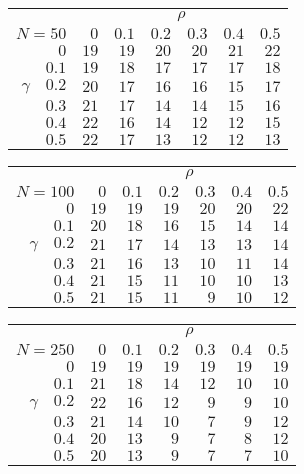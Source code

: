 \begin{tabular}{r|rrrrrr}
\hline\hline
 &\multicolumn{6}{c}{$\rho$} \\ 
 $N = 50$ & $0$ & $0.1$ & $0.2$ & $0.3$ & $0.4$ & $0.5$ \\ 
 \hline$0$ & $19$ & $19$ & $20$ & $20$ & $21$ & $22$\\ 
$0.1$ & $19$ & $18$ & $17$ & $17$ & $17$ & $18$\\ 
$\gamma\quad$$0.2$ & $20$ & $17$ & $16$ & $16$ & $15$ & $17$\\ 
$0.3$ & $21$ & $17$ & $14$ & $14$ & $15$ & $16$\\ 
$0.4$ & $22$ & $16$ & $14$ & $12$ & $12$ & $15$\\ 
$0.5$ & $22$ & $17$ & $13$ & $12$ & $12$ & $13$\\ 
 \hline 
 \end{tabular}
 
 \vspace{2em} 
 
\begin{tabular}{r|rrrrrr}
\hline\hline
 &\multicolumn{6}{c}{$\rho$} \\ 
 $N = 100$ & $0$ & $0.1$ & $0.2$ & $0.3$ & $0.4$ & $0.5$ \\ 
 \hline$0$ & $19$ & $19$ & $19$ & $20$ & $20$ & $22$\\ 
$0.1$ & $20$ & $18$ & $16$ & $15$ & $14$ & $14$\\ 
$\gamma\quad$$0.2$ & $21$ & $17$ & $14$ & $13$ & $13$ & $14$\\ 
$0.3$ & $21$ & $16$ & $13$ & $10$ & $11$ & $14$\\ 
$0.4$ & $21$ & $15$ & $11$ & $10$ & $10$ & $13$\\ 
$0.5$ & $21$ & $15$ & $11$ & $9$ & $10$ & $12$\\ 
 \hline 
 \end{tabular}
 
 \vspace{2em} 
 
\begin{tabular}{r|rrrrrr}
\hline\hline
 &\multicolumn{6}{c}{$\rho$} \\ 
 $N = 250$ & $0$ & $0.1$ & $0.2$ & $0.3$ & $0.4$ & $0.5$ \\ 
 \hline$0$ & $19$ & $19$ & $19$ & $19$ & $19$ & $19$\\ 
$0.1$ & $21$ & $18$ & $14$ & $12$ & $10$ & $10$\\ 
$\gamma\quad$$0.2$ & $22$ & $16$ & $12$ & $9$ & $9$ & $10$\\ 
$0.3$ & $21$ & $14$ & $10$ & $7$ & $9$ & $12$\\ 
$0.4$ & $20$ & $13$ & $9$ & $7$ & $8$ & $12$\\ 
$0.5$ & $20$ & $13$ & $9$ & $7$ & $7$ & $10$\\ 
 \hline 
 \end{tabular}